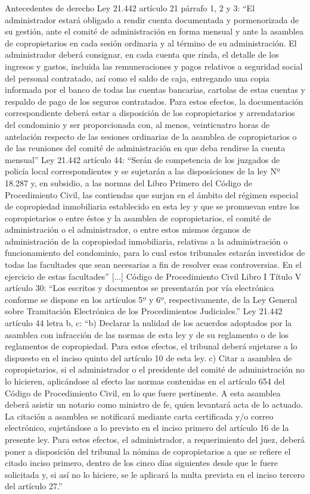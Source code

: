 Antecedentes de derecho
Ley 21.442 artículo 21 párrafo 1, 2 y 3: “El administrador estará obligado a rendir cuenta documentada y pormenorizada de su gestión, ante el comité de administración en forma mensual y ante la asamblea de copropietarios en cada sesión ordinaria y al término de su administración.
El administrador deberá consignar, en cada cuenta que rinda, el detalle de los ingresos y gastos, incluida las remuneraciones y pagos relativos a seguridad social del personal contratado, así como el saldo de caja, entregando una copia informada por el banco de todas las cuentas bancarias, cartolas de estas cuentas y respaldo de pago de los seguros contratados.
Para estos efectos, la documentación correspondiente deberá estar a disposición de los copropietarios y arrendatarios del condominio y ser proporcionada con, al menos, veinticuatro horas de antelación respecto de las sesiones ordinarias de la asamblea de copropietarios o de las reuniones del comité de administración en que deba rendirse la cuenta mensual”
Ley 21.442 artículo 44: “Serán de competencia de los juzgados de policía local correspondientes y se sujetarán a las disposiciones de la ley Nº 18.287 y, en subsidio, a las normas del Libro Primero del Código de Procedimiento Civil, las contiendas que surjan en el ámbito del régimen especial de copropiedad inmobiliaria establecido en esta ley y que se promuevan entre los copropietarios o entre éstos y la asamblea de copropietarios, el comité de administración o el administrador, o entre estos mismos órganos de administración de la copropiedad inmobiliaria, relativas a la administración o funcionamiento del condominio, para lo cual estos tribunales estarán investidos de todas las facultades que sean necesarias a fin de resolver esas controversias. En el ejercicio de estas facultades” [...]
Código de Procedimiento Civil Libro I Título V artículo 30: “Los escritos y documentos se presentarán por vía electrónica conforme se dispone en los artículos 5º y 6º, respectivamente, de la Ley General sobre Tramitación Electrónica de los Procedimientos Judiciales.”
Ley 21.442 artículo 44 letra b, c: “b) Declarar la nulidad de los acuerdos adoptados por la asamblea con infracción de las normas de esta ley y de su reglamento o de los reglamentos de copropiedad. Para estos efectos, el tribunal deberá sujetarse a lo dispuesto en el inciso quinto del artículo 10 de esta ley.
c) Citar a asamblea de copropietarios, si el administrador o el presidente del comité de administración no lo hicieren, aplicándose al efecto las normas contenidas en el artículo 654 del Código de Procedimiento Civil, en lo que fuere pertinente. A esta asamblea deberá asistir un notario como ministro de fe, quien levantará acta de lo actuado. La citación a asamblea se notificará mediante carta certificada y/o correo electrónico, sujetándose a lo previsto en el inciso primero del artículo 16 de la presente ley. Para estos efectos, el administrador, a requerimiento del juez, deberá poner a disposición del tribunal la nómina de copropietarios a que se refiere el citado inciso primero, dentro de los cinco días siguientes desde que le fuere solicitada y, si así no lo hiciere, se le aplicará la multa prevista en el inciso tercero del artículo 27.”
